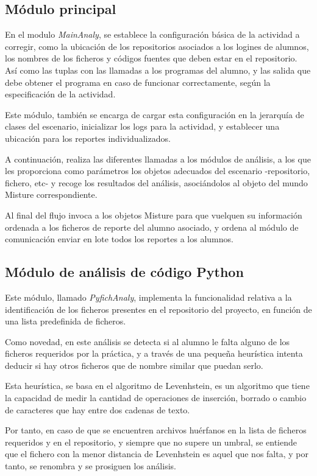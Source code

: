 \subsection{Módulo principal}

En el modulo \textit{MainAnaly}, se establece la configuración básica de la actividad a corregir, como la ubicación de los repositorios asociados a los logines de alumnos, los nombres de los ficheros y códigos fuentes que deben estar en el repositorio. Así como las tuplas con las llamadas a los programas del alumno, y las salida que debe obtener el programa en caso de funcionar correctamente, según la especificación de la actividad.


Este módulo, también se encarga de cargar esta configuración en la jerarquía de clases del escenario, inicializar los logs para la actividad, y establecer una ubicación para los reportes individualizados.


A continuación, realiza las diferentes llamadas a los módulos de análisis, a los que les proporciona como parámetros los objetos adecuados del escenario -repositorio, fichero, etc- y recoge los resultados del análisis, asociándolos al objeto del mundo Misture correspondiente.

Al final del flujo invoca a los objetos Misture para que vuelquen su información ordenada a los ficheros de reporte del alumno asociado, y ordena al módulo de comunicación enviar en lote todos los reportes a los alumnos.

\subsection{Módulo de análisis de código Python}

Este módulo, llamado \textit{PyfichAnaly}, implementa la funcionalidad relativa a la identificación de los ficheros presentes en el repositorio del proyecto, en función de una lista predefinida de ficheros.


Como novedad, en este análisis se detecta si al alumno le falta alguno de los ficheros requeridos por la práctica, y a través de una pequeña heurística intenta deducir si hay otros ficheros que de nombre similar que puedan serlo.


Esta heurística, se basa en el algoritmo de Levenhstein, es un algoritmo que tiene la capacidad de medir la cantidad de operaciones de inserción, borrado o cambio de caracteres que hay entre dos cadenas de texto.


Por tanto, en caso de que se encuentren archivos huérfanos en la lista de ficheros requeridos y en el repositorio, y siempre que no supere un umbral, se entiende que el fichero con la menor distancia de Levenhstein es aquel que nos falta, y por tanto, se renombra y se prosiguen los análisis.


